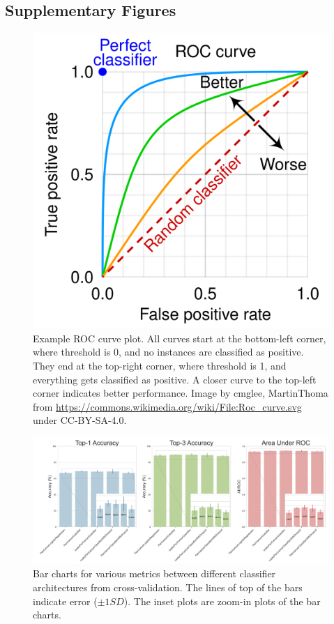 \documentclass{l4proj}
\begin{document}
\begin{appendices}
\chapter{Supplementary Figures}
\begin{figure}[h]
    \centering
    \includegraphics[width=0.5\linewidth]{images/roc_curv.png}
    \caption{Example ROC curve plot. All curves start at the bottom-left corner, where threshold is 0, and no instances are classified as positive. They end at the top-right corner, where threshold is 1, and everything gets classified as positive. A closer curve to the top-left corner indicates better performance. Image by cmglee, MartinThoma from \url{https://commons.wikimedia.org/wiki/File:Roc_curve.svg} under CC-BY-SA-4.0.}
    \label{fig:roc}
\end{figure}

\begin{figure}[h]
    \centering
    \includegraphics[width=1\linewidth]{images/CV_metrics.png}
    \caption{Bar charts for various metrics between different classifier architectures from cross-validation. The lines of top of the bars indicate error ($\pm 1SD$). The inset plots are zoom-in plots of the bar charts.}
    \label{fig:cv-barchart}
\end{figure}


\end{appendices}
\end{document}

